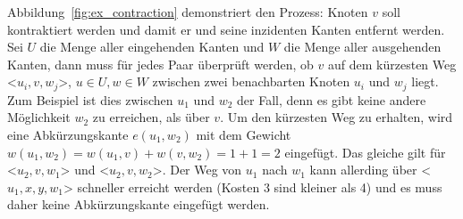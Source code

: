 Abbildung~\ref{fig:ex_contraction} demonstriert den Prozess: Knoten $v$ soll kontraktiert werden und
damit er und seine inzidenten Kanten entfernt werden. Sei $U$ die Menge aller eingehenden Kanten und
$W$ die Menge aller ausgehenden Kanten, dann muss für jedes Paar überprüft werden, ob $v$ auf dem
kürzesten Weg <$u_i,v,w_j$>, $u \in U, w \in W$ zwischen zwei benachbarten Knoten $u_i$ und $w_j$
liegt. Zum Beispiel ist dies zwischen $u_1$ und $w_2$ der Fall, denn es gibt keine andere
Möglichkeit $w_2$ zu erreichen, als über $v$. Um den kürzesten Weg zu erhalten, wird eine
Abkürzungskante $e(u_1,w_2)$ mit dem Gewicht $w(u_1,w_2)=w(u_1,v)+w(v,w_2)=1+1=2$ eingefügt. Das
gleiche gilt für <$u_2,v,w_1$> und <$u_2,v,w_2$>. Der Weg von $u_1$ nach $w_1$ kann allerding über
<$u_1,x,y,w_1$> schneller erreicht werden (Kosten 3 sind kleiner als 4) und es muss daher keine
Abkürzungskante eingefügt werden.
